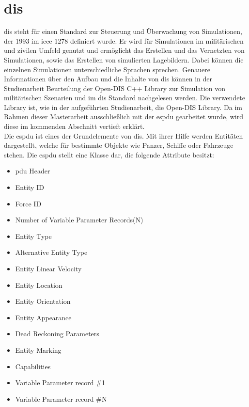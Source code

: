 \section{\acl{dis}}
\acf{dis} steht für einen Standard zur Steuerung und Überwachung  von Simulationen, der 1993 im \ac{ieee} 1278 definiert wurde. Er wird für Simulationen im militärischen und zivilen Umfeld genutzt und ermöglicht das Erstellen und das Vernetzten von Simulationen, sowie das Erstellen von simulierten Lagebildern. Dabei können die einzelnen Simulationen unterschiedliche Sprachen sprechen. Genauere Informationen über den Aufbau und die Inhalte von \ac{dis} können in der Studienarbeit \glqq Beurteilung der Open-DIS C++ Library zur Simulation von militärischen Szenarien\grqq{} und im \ac{dis} Standard nachgelesen werden. Die verwendete Library ist, wie in der aufgeführten Studienarbeit, die  \glqq Open-DIS\grqq{} Library. Da im Rahmen dieser Masterarbeit ausschließlich mit der \acf{espdu} gearbeitet wurde, wird diese im kommenden Abschnitt vertieft erklärt. \\
Die \ac{espdu} ist eines der Grundelemente von \ac{dis}. Mit ihrer Hilfe werden Entitäten dargestellt, welche für bestimmte Objekte wie Panzer, Schiffe oder Fahrzeuge stehen. Die \ac{espdu} stellt eine Klasse dar, die folgende Attribute besitzt:
\begin{itemize}
	\singlespacing
	\item \ac{pdu} Header
	\item Entity ID
	\item Force ID
	\item Number of Variable Parameter Records(N)
	\item Entity Type
	\item Alternative Entity Type
	\item Entity Linear Velocity
	\item Entity Location
	\item Entity Orientation
	\item Entity Appearance
	\item Dead Reckoning Parameters
	\item Entity Marking
	\item Capabilities
	\item Variable Parameter record \#1
	\item Variable Parameter record \#N
\end{itemize} 


